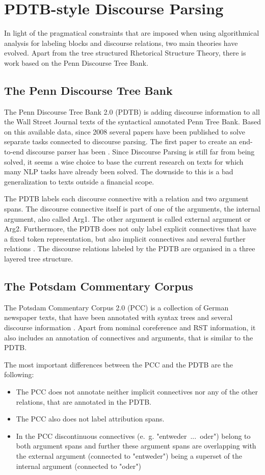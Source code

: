 \documentclass[10pt,a4paper]{article}
\begin{document}
\section{PDTB-style Discourse Parsing}\label{DiscParse}
In light of the pragmatical constraints that are imposed when using algorithmical analysis for labeling blocks and discourse relations, two main theories have evolved. Apart from the tree structured Rhetorical Structure Theory, there is work based on the Penn Discourse Tree Bank.

\subsection{The Penn Discourse Tree Bank}
The Penn Discourse Tree Bank 2.0 (PDTB) is adding discourse information to all the Wall Street Journal texts of the syntactical annotated Penn Tree Bank. Based on this available data, since 2008 several papers have been published to solve separate tasks connected to discourse parsing. The first paper to create an end-to-end discourse parser has been \cite{Lin12}.
Since Discourse Parsing is still far from being solved, it seems a wise choice to base the current research on texts for which many NLP tasks have already been solved. The downside to this is a bad generalization to texts outside a financial scope.

The PDTB labels each discourse connective with a relation and two argument spans. The discourse connective itself is part of one of the arguments, the internal argument, also called Arg1. The other argument is called external argument or Arg2. Furthermore, the PDTB does not only label explicit connectives that have a fixed token representation, but also implicit connectives and several further relations \cite{PDTB}. The discourse relations labeled by the PDTB are organised in a three layered tree structure.

\subsection{The Potsdam Commentary Corpus}\label{PCC}
The Potsdam Commentary Corpus 2.0 (PCC) is a collection of German newspaper texts, that have been annotated with syntax trees and several discourse information \cite{stede2014pcc}. Apart from nominal coreference and RST information, it also includes an annotation of connectives and arguments, that is similar to the PDTB.

The most important differences between the PCC and the PDTB are the following:
\begin{itemize}
\item The PCC does not annotate neither implicit connectives nor any of the other relations, that are annotated in the PDTB.
\item The PCC also does not label attribution spans.
\item In the PCC discontinuous connectives (e.~g. "entweder~...~oder") belong to both argument spans and further these argument spans are overlapping with the external argument (connected to "entweder") being a superset of the internal argument (connected to "oder")
\end{itemize}
\end{document}

